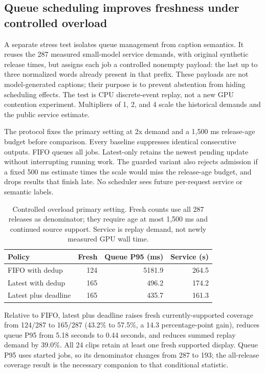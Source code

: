 \subsection{Queue scheduling improves freshness under controlled overload}
A separate stress test isolates queue management from caption semantics. It reuses the 287 measured small-model service demands, with original synthetic release times, but assigns each job a controlled nonempty payload: the last up to three normalized words already present in that prefix. These payloads are not model-generated captions; their purpose is to prevent abstention from hiding scheduling effects. The test is CPU discrete-event replay, not a new GPU contention experiment. Multipliers of 1, 2, and 4 scale the historical demands and the public service estimate.

The protocol fixes the primary setting at 2x demand and a 1,500 ms release-age budget before comparison. Every baseline suppresses identical consecutive outputs. FIFO queues all jobs. Latest-only retains the newest pending update without interrupting running work. The guarded variant also rejects admission if a fixed 500 ms estimate times the scale would miss the release-age budget, and drops results that finish late. No scheduler sees future per-request service or semantic labels.

\begin{table}[t]
\caption{Controlled overload primary setting. Fresh counts use all 287 releases as denominator; they require age at most 1,500 ms and continued source support. Service is replay demand, not newly measured GPU wall time.}
\label{tab:overload}\centering
\begin{tabular}{lrrr}
\toprule
Policy & Fresh & Queue P95 (ms) & Service (s)\\
\midrule
FIFO with dedup & 124 & 5181.9 & 264.5\\
Latest with dedup & 165 & 496.2 & 174.2\\
Latest plus deadline & 165 & 435.7 & 161.3\\
\bottomrule
\end{tabular}\end{table}

Relative to FIFO, latest plus deadline raises fresh currently-supported coverage from 124/287 to 165/287 (43.2\% to 57.5\%, a 14.3 percentage-point gain), reduces queue P95 from 5.18 seconds to 0.44 seconds, and reduces summed replay demand by 39.0\%. All 24 clips retain at least one fresh supported display. Queue P95 uses started jobs, so its denominator changes from 287 to 193; the all-release coverage result is the necessary companion to that conditional statistic.

